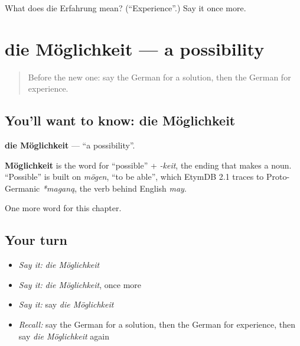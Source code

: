 \begin{tcolorbox}[breakable,colback=teal!4,colframe=teal!35!black,title={Before you move on}]
What does die Erfahrung mean? (\textquotedblleft{}Experience\textquotedblright{}.) Say it once more.
\end{tcolorbox}
\section[die Möglichkeit]{die Möglichkeit — a possibility}

\label{lesson:GE-C166-moeglichkeit}



\begin{quote}
Before the new one: say the German for a solution, then the German for experience.
\end{quote}

\subsection*{You'll want to know: die Möglichkeit}
\textbf{die Möglichkeit} — \textquotedblleft{}a possibility\textquotedblright{}.

\begin{cousinweb}
\textbf{Möglichkeit} is the word for \textquotedblleft{}possible\textquotedblright{} + \emph{-keit}, the ending that makes a noun. \textquotedblleft{}Possible\textquotedblright{} is built on \emph{mögen}, \textquotedblleft{}to be able\textquotedblright{}, which EtymDB 2.1 traces to Proto-Germanic \emph{*maganą}, the verb behind English \emph{may}.
\end{cousinweb}

\begin{grammarlens}[title={What you've built}]
One more word for this chapter.
\end{grammarlens}

\subsection*{Your turn}
\begin{itemize}
\raggedright
  \item \emph{Say it:} \emph{die Möglichkeit}
  \item \emph{Say it:} \emph{die Möglichkeit}, once more
  \item \emph{Say it:} say \emph{die Möglichkeit}
  \item \emph{Recall:} say the German for a solution, then the German for experience, then say \emph{die Möglichkeit} again
\end{itemize}

